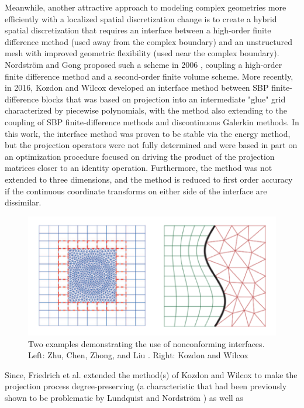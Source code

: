 Meanwhile, another attractive approach to modeling complex geometries more efficiently
with a localized spatial discretization change is to create a hybrid spatial
discretization that requires an interface between a high-order finite difference
method (used away from the complex boundary) and an unstructured mesh with
improved geometric flexibility (used near the complex boundary). Nordstr{\"o}m and Gong
proposed such a scheme in 2006 \cite{nordstrom2006stable}, coupling a high-order finite difference method
and a second-order finite volume scheme. More recently, in 2016, Kozdon and Wilcox
\cite{kozdon2016stable} developed an interface method between SBP finite-difference
blocks that was based on projection into an intermediate "glue" grid characterized by
piecewise polynomials, with the method also extending to the coupling of SBP
finite-difference methods and discontinuous Galerkin methods. In this work, the
interface method was proven to be stable via the energy method, but the projection operators were
not fully determined and were based in part on an optimization procedure focused on
driving the product of the projection matrices closer to an identity operation.
Furthermore, the method was not extended to three dimensions, and the method is reduced
to first order accuracy if the continuous coordinate transforms on either side of the
interface are dissimilar.
\begin{figure}
\centering
\includegraphics[width=0.9\linewidth,trim=4 4 4 4,clip]{figures/nonconforming_samples.png}
\caption{Two examples demonstrating the use of nonconforming interfaces. Left: Zhu, Chen, Zhong, and Liu \cite{zhu2011hybrid}.
	 Right: Kozdon and Wilcox \cite{kozdon2016stable}}
\label{fig:nonconforming_samples}
\end{figure}
Since, Friedrich et al. \cite{friedrich2018conservative} extended the
method(s) of Kozdon and Wilcox to make the
projection process degree-preserving (a characteristic that had been
previously shown to be problematic by Lundquist and Nordstr{\"o}m \cite{lundquist2016suboptimal}) as well as
